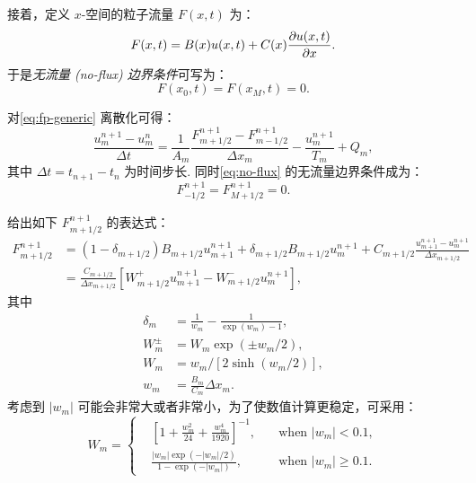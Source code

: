 接着，定义 $x$-空间的粒子流量 $F(x,t)$ 为：
\begin{equation}
  \label{eq:fp-f}
  F(x,t) = B(x) u(x,t) + C(x) \frac{\partial u(x,t)}{\partial x} .
\end{equation}
于是\emph{无流量 (no-flux) 边界条件}可写为\cite{park1995}：
\begin{equation}
  \label{eq:no-flux}
  F(x_0, t) = F(x_M, t) = 0 .
\end{equation}

对\autoref{eq:fp-generic} 离散化可得：
\begin{equation}
  \label{eq:fp-disc}
  \frac{u_m^{n+1} - u_m^n}{\Delta t}
    = \frac{1}{A_m} \frac{F_{m+1/2}^{n+1} - F_{m-1/2}^{n+1}}{\Delta x_m}
      - \frac{u_m^{n+1}}{T_m} + Q_m ,
\end{equation}
其中 $\Delta t = t_{n+1} - t_n$ 为时间步长.
同时\autoref{eq:no-flux} 的无流量边界条件成为：
\begin{equation}
  \label{eq:no-flux-disc}
  F_{-1/2}^{n+1} = F_{M+1/2}^{n+1} = 0 .
\end{equation}

 给出如下 $F_{m+1/2}^{n+1}$ 的表达式：
\begin{align}
  \label{eq:fp-f-chang70}
  F_{m+1/2}^{n+1} & = (1 - \delta_{m+1/2}) B_{m+1/2} u_{m+1}^{n+1}
      + \delta_{m+1/2} B_{m+1/2} u_m^{n+1}
      + C_{m+1/2} \frac{u_{m+1}^{n+1} - u_m^{n+1}}{\Delta x_{m+1/2}} \\
    & = \frac{C_{m+1/2}}{\Delta x_{m+1/2}} \left[
      W_{m+1/2}^{+} u_{m+1}^{n+1} - W_{m+1/2}^{-} u_m^{n+1} \right] ,
\end{align}
其中
\begin{align}
  \delta_m & = \frac{1}{w_m} - \frac{1}{\exp(w_m) - 1} ,
    \label{eq:fp-delta-m} \\
  W_m^{\pm} & = W_m \exp(\pm w_m / 2) ,
    \label{eq:fp-Wm-pm} \\
  W_m & = w_m / [2 \sinh(w_m / 2)] ,
    \label{eq:fp-Wm} \\
  w_m & = \frac{B_m}{C_m} \Delta x_m .
    \label{eq:fp-wm}
\end{align}
考虑到 $|w_m|$ 可能会非常大或者非常小，为了使数值计算更稳定，可采用\cite{park1996}：
\begin{equation}
  \label{eq:fp-Wm-calc}
  W_m = \left\{
    \begin{alignedat}{2}
      & \left[ 1 + \frac{w_m^2}{24} + \frac{w_m^4}{1920} \right]^{-1} ,
        & \quad\text{when~} |w_m| < 0.1 , \\
      & \frac{|w_m| \exp(-|w_m|/2)}{1 - \exp(-|w_m|)} ,
        & \quad\text{when~} |w_m| \ge 0.1 .
    \end{alignedat}
  \right.
\end{equation}

